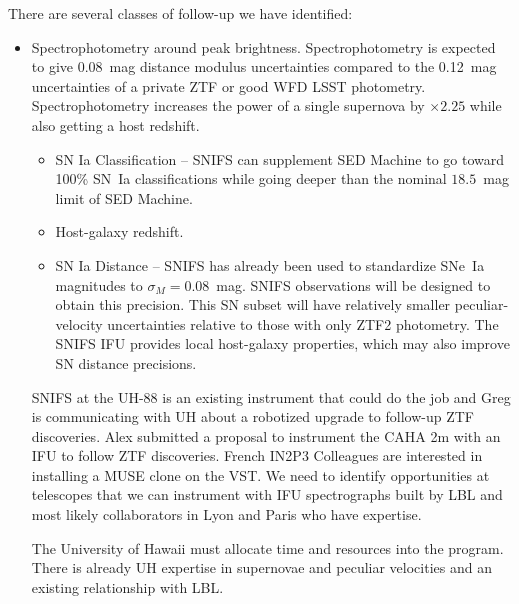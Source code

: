 There are several classes of follow-up we have identified:
\begin{itemize}
\item Spectrophotometry around peak brightness.  Spectrophotometry is expected to give 0.08~mag distance modulus uncertainties compared
to the 0.12~mag uncertainties of a private ZTF or good WFD LSST photometry.  Spectrophotometry increases the power
of a single supernova by $\times 2.25$ while also getting a host redshift.
\begin{itemize}
\item SN Ia Classification -- SNIFS can supplement SED Machine to go toward 100\% SN~Ia classifications
while going deeper than the nominal $18.5$~mag limit of SED Machine.
\item Host-galaxy redshift.
\item SN Ia Distance -- SNIFS has already been used to standardize SNe~Ia magnitudes to $\sigma_M=0.08$~mag.  SNIFS observations will be
designed to obtain this precision.  This SN subset  will have relatively smaller peculiar-velocity uncertainties relative to 
those with only ZTF2 photometry.  The SNIFS IFU provides local host-galaxy properties, which may also improve SN distance precisions.
\end{itemize}
SNIFS at the UH-88 is an existing instrument that could do the job and Greg is communicating with UH about
a robotized upgrade to follow-up ZTF discoveries.
Alex submitted a proposal to instrument the CAHA 2m with
an IFU to follow ZTF discoveries.  French IN2P3 Colleagues are interested in installing a MUSE clone on the VST.
We need to identify opportunities at telescopes that we can instrument with  IFU spectrographs
built by LBL and most likely collaborators in Lyon and Paris who have expertise.

The University of Hawaii must allocate time and resources into the program.  There is already UH expertise in supernovae and peculiar velocities and an existing relationship
with LBL.


\end{itemize}
